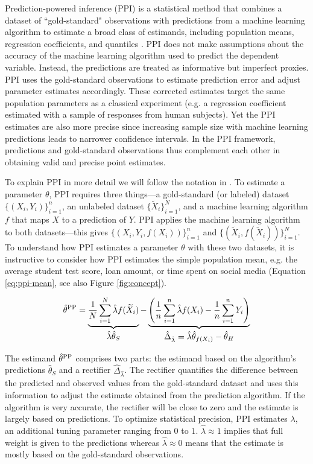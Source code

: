 \documentclass{article}
\begin{document}
Prediction-powered inference (PPI) is a statistical method that combines a dataset of ``gold-standard" observations with predictions from a machine learning algorithm to estimate a broad class of estimands, including population means, regression coefficients, and quantiles  \citep{angelopoulos_prediction-powered_2023-1,angelopoulos2024ppi}. PPI does not make assumptions about the accuracy of the machine learning algorithm used to predict the dependent variable. Instead, the predictions are treated as informative but imperfect proxies. PPI uses the gold-standard observations to estimate prediction error and adjust parameter estimates accordingly. These corrected estimates target the same population parameters as a classical experiment (e.g. a regression coefficient estimated with a sample of responses from human subjects). Yet the PPI estimates are also more precise since increasing sample size with machine learning predictions leads to narrower confidence intervals. In the PPI framework, predictions and gold-standard observations thus complement each other in obtaining valid and precise point estimates.

To explain PPI in more detail we will follow the notation in \citet{angelopoulos_prediction-powered_2023-1,angelopoulos2024ppi}. To estimate a parameter $\theta$, PPI requires three things---a gold-standard (or labeled) dataset $\{(X_i, Y_i)\}_{i=1}^n$, an unlabeled dataset $\{\widetilde{X}_i\}_{i=1}^N$, and a machine learning algorithm $f$ that maps $X$ to a prediction of $Y$. PPI applies the machine learning algorithm to both datasets---this gives $\{(X_i,Y_i,f(X_i))\}_{i=1}^n$ and $\{(\widetilde{X}_i, f(\widetilde{X}_i))\}_{i=1}^N$.  
To understand how PPI estimates a parameter $\theta$ with these two datasets, it is instructive to consider how PPI estimates the simple population mean, e.g. the average student test score, loan amount, or time spent on social media (Equation \ref{eq:ppi-mean}, see also Figure \ref{fig:concept}). 


\begin{equation}\label{eq:ppi-mean}
    \hat{\theta}^\PPI = \underbrace{\frac{1}{N} \sum_{i=1}^N \hat \lambda f(\widetilde{X}_i)}_{\displaystyle \huge \hat \lambda \hat \theta_S} - \underbrace{\left( \frac{1}{n} \sum_{i=1}^n\hat \lambda f(X_i)- \frac{1}{n} \sum_{i=1}^n Y_i\right)}_{\displaystyle \huge \hat \Delta_{\hat \lambda} = \hat \lambda \hat  \theta_{f(X_i)}- \hat \theta_H} 
\end{equation}

The estimand $\hat{\theta}^{\mathrm{PP}}$ comprises two parts: the estimand based on the algorithm's predictions $\hat \theta_S$ and a rectifier $\hat \Delta_{\hat \lambda}$. The rectifier quantifies the difference between the predicted and observed values from the gold-standard dataset and uses this information to adjust the estimate obtained from the prediction algorithm. If the algorithm is very accurate, the rectifier will be close to zero and the estimate is largely based on predictions. To optimize statistical precision, PPI estimates $\lambda$, an additional tuning parameter ranging from $0$ to $1$. $\hat \lambda \approx 1$ implies that full weight is given to the predictions whereas $\hat \lambda \approx 0$ means that the estimate is mostly based on the gold-standard observations.
\end{document}
